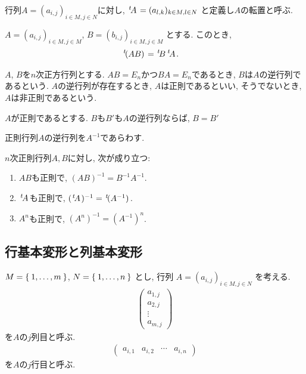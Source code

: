 \begin{definition}
行列$A=(a_{i,j})_{i\in M, j\in N}$に対し,
${\left.^{t}\!A\right.}=(a_{l,k})_{k\in M, l\in N}$
と定義し$A$の転置と呼ぶ.
\end{definition}
\begin{prop}
$A=(a_{i,j})_{i\in M, j\in M}$,
$B=(b_{i,j})_{i\in M, j\in M}$
とする.
このとき,
\begin{align*}
{\left.^{t}\!(AB)\right.}&={\left.^{t}\!B\right.}{\left.^{t}\!A\right.}.
\end{align*}
\end{prop}


\begin{definition}
$A$, $B$を$n$次正方行列とする.
$AB=E_n$かつ$BA=E_n$であるとき,
$B$は$A$の逆行列であるという.
$A$の逆行列が存在するとき,
$A$は正則であるといい,
そうでないとき, $A$は非正則であるという.
\end{definition}
\begin{prop}
$A$が正則であるとする.
$B$も$B'$も$A$の逆行列ならば, 
$B=B'$
\end{prop}
\begin{definition}
正則行列$A$の逆行列を$A^{-1}$であらわす.
\end{definition}

\begin{prop}
$n$次正則行列$A, B$に対し, 次が成り立つ:
\begin{enumerate}
\item $AB$も正則で, $(AB)^{-1}=B^{-1}A^{-1}$.
\item ${\left.^{t}\!A\right.}$も正則で, $({\left.^{t}\!A\right.})^{-1}={\left.^{t}\!(A^{-1})\right.}$.
\item $A^n$も正則で, $(A^{n})^{-1}=(A^{-1})^n$.
\end{enumerate}
\end{prop}

\subsection{行基本変形と列基本変形}



$M=\Set{1,\ldots,m}$,
$N=\Set{1,\ldots,n}$
とし,
行列
$A=(a_{i,j})_{i\in M, j\in N}$
を考える.
\begin{align*}
\begin{pmatrix}
a_{1,j}\\a_{2,j}\\\vdots \\a_{m,j}
\end{pmatrix}
\end{align*}
を$A$の$j$列目と呼ぶ.
\begin{align*}
\begin{pmatrix}
a_{i,1}& a_{i,2}&\cdots &a_{i,n}
\end{pmatrix}
\end{align*}
を$A$の$j$行目と呼ぶ.


